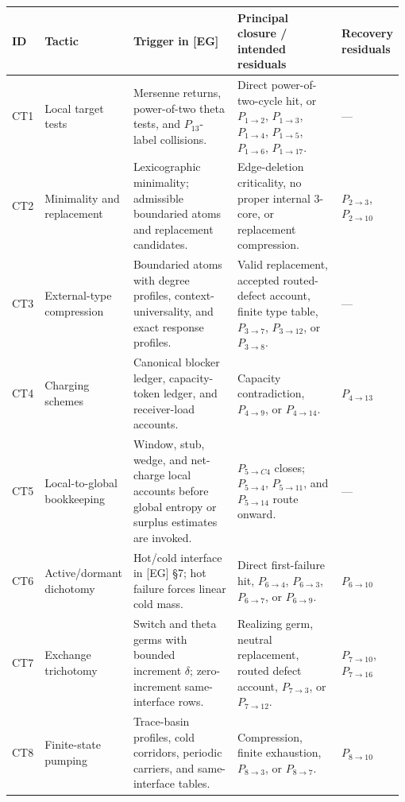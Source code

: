 \documentclass[
  11pt,
]{article}
\theoremstyle{definition}
\begin{document}
\begingroup
\tiny
\setlength{\tabcolsep}{1pt}
\begin{longtable}[]{@{}
  >{\raggedright\arraybackslash}p{0.08\linewidth}
  >{\raggedright\arraybackslash}p{0.19\linewidth}
  >{\raggedright\arraybackslash}p{0.28\linewidth}
  >{\raggedright\arraybackslash}p{0.28\linewidth}
  >{\raggedright\arraybackslash}p{0.148\linewidth}@{}}
\toprule\noalign{}
ID & Tactic & Trigger in {[}EG{]} & Principal closure / intended residuals & Recovery residuals \\
\midrule\noalign{}
\endhead
\bottomrule\noalign{}
\endlastfoot
CT1 & Local target tests & Mersenne returns, power-of-two theta tests, and \(P_{13}\)-label collisions. & Direct power-of-two-cycle hit, or \(P_{1\to2}\), \(P_{1\to3}\), \(P_{1\to4}\), \(P_{1\to5}\), \(P_{1\to6}\), \(P_{1\to17}\). & --- \\
CT2 & Minimality and replacement & Lexicographic minimality; admissible boundaried atoms and replacement candidates. & Edge-deletion criticality, no proper internal 3-core, or replacement compression. & \(P_{2\to3}\), \(P_{2\to10}\) \\
CT3 & External-type compression & Boundaried atoms with degree profiles, context-universality, and exact response profiles. & Valid replacement, accepted routed-defect account, finite type table, \(P_{3\to7}\), \(P_{3\to12}\), or \(P_{3\to8}\). & --- \\
CT4 & Charging schemes & Canonical blocker ledger, capacity-token ledger, and receiver-load accounts. & Capacity contradiction, \(P_{4\to9}\), or \(P_{4\to14}\). & \(P_{4\to13}\) \\
CT5 & Local-to-global bookkeeping & Window, stub, wedge, and net-charge local accounts before global entropy or surplus estimates are invoked. & \(P_{5\to C4}\) closes; \(P_{5\to4}\), \(P_{5\to11}\), and \(P_{5\to14}\) route onward. & --- \\
CT6 & Active/dormant dichotomy & Hot/cold interface in {[}EG{]} §7; hot failure forces linear cold mass. & Direct first-failure hit, \(P_{6\to4}\), \(P_{6\to3}\), \(P_{6\to7}\), or \(P_{6\to9}\). & \(P_{6\to10}\) \\
CT7 & Exchange trichotomy & Switch and theta germs with bounded increment \(\delta\); zero-increment same-interface rows. & Realizing germ, neutral replacement, routed defect account, \(P_{7\to3}\), or \(P_{7\to12}\). & \(P_{7\to10}\), \(P_{7\to16}\) \\
CT8 & Finite-state pumping & Trace-basin profiles, cold corridors, periodic carriers, and same-interface tables. & Compression, finite exhaustion, \(P_{8\to3}\), or \(P_{8\to7}\). & \(P_{8\to10}\) \\

\end{longtable}
\end{document}
